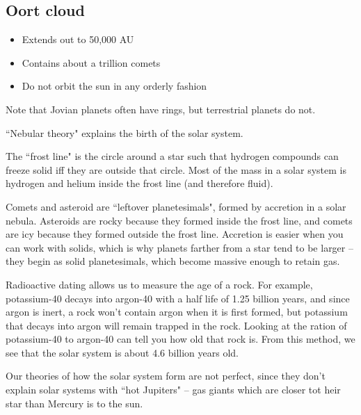 \documentclass[class=article, crop=false]{standalone}
\begin{document}
\subsection{Oort cloud}
\begin{itemize}
    \item Extends out to 50,000 AU
    \item Contains about a trillion comets
    \item Do not orbit the sun in any orderly fashion
\end{itemize}
Note that Jovian planets often have rings, but terrestrial planets do not.
\par
``Nebular theory" explains the birth of the solar system.
\par
The ``frost line" is the circle around a star such that hydrogen compounds can freeze solid iff they are outside that circle. Most of the mass in a solar system is hydrogen and helium inside the frost line (and therefore fluid).
\par
Comets and asteroid are ``leftover planetesimals", formed by accretion in a solar nebula. Asteroids are rocky because they formed inside the frost line, and comets are icy because they formed outside the frost line. Accretion is easier when you can work with solids, which is why planets farther from a star tend to be larger -- they begin as solid planetesimals, which become massive enough to retain gas.
\par
Radioactive dating allows us to measure the age of a rock. For example, potassium-40 decays into argon-40 with a half life of 1.25 billion years, and since argon is inert, a rock won't contain argon when it is first formed, but potassium that decays into argon will remain trapped in the rock. Looking at the ration of potassium-40 to argon-40 can tell you how old that rock is. From this method, we see that the solar system is about 4.6 billion years old.
\par
Our theories of how the solar system form are not perfect, since they don't explain solar systems with ``hot Jupiters" -- gas giants which are closer tot heir star than Mercury is to the sun.
\end{document}
